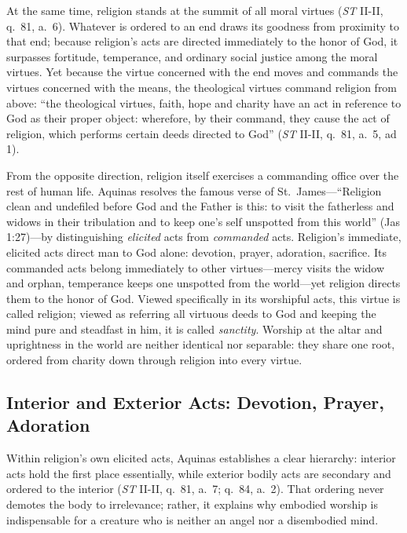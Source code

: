 At the same time, religion stands at the summit of all moral virtues (\emph{ST} II-II, q.\ 81, a.\ 6). Whatever is ordered to an end draws its goodness from proximity to that end; because religion's acts are directed immediately to the honor of God, it surpasses fortitude, temperance, and ordinary social justice among the moral virtues. Yet because the virtue concerned with the end moves and commands the virtues concerned with the means, the theological virtues command religion from above: ``the theological virtues, faith, hope and charity have an act in reference to God as their proper object: wherefore, by their command, they cause the act of religion, which performs certain deeds directed to God'' (\emph{ST} II-II, q.\ 81, a.\ 5, ad 1).

From the opposite direction, religion itself exercises a commanding office over the rest of human life. Aquinas resolves the famous verse of St.\ James---``Religion clean and undefiled before God and the Father is this: to visit the fatherless and widows in their tribulation and to keep one's self unspotted from this world'' (Jas 1:27)---by distinguishing \emph{elicited} acts from \emph{commanded} acts. Religion's immediate, elicited acts direct man to God alone: devotion, prayer, adoration, sacrifice. Its commanded acts belong immediately to other virtues---mercy visits the widow and orphan, temperance keeps one unspotted from the world---yet religion directs them to the honor of God. Viewed specifically in its worshipful acts, this virtue is called religion; viewed as referring all virtuous deeds to God and keeping the mind pure and steadfast in him, it is called \emph{sanctity}. Worship at the altar and uprightness in the world are neither identical nor separable: they share one root, ordered from charity down through religion into every virtue.

\subsection{Interior and Exterior Acts: Devotion, Prayer, Adoration}

Within religion's own elicited acts, Aquinas establishes a clear hierarchy: interior acts hold the first place essentially, while exterior bodily acts are secondary and ordered to the interior (\emph{ST} II-II, q.\ 81, a.\ 7; q.\ 84, a.\ 2). That ordering never demotes the body to irrelevance; rather, it explains why embodied worship is indispensable for a creature who is neither an angel nor a disembodied mind.

